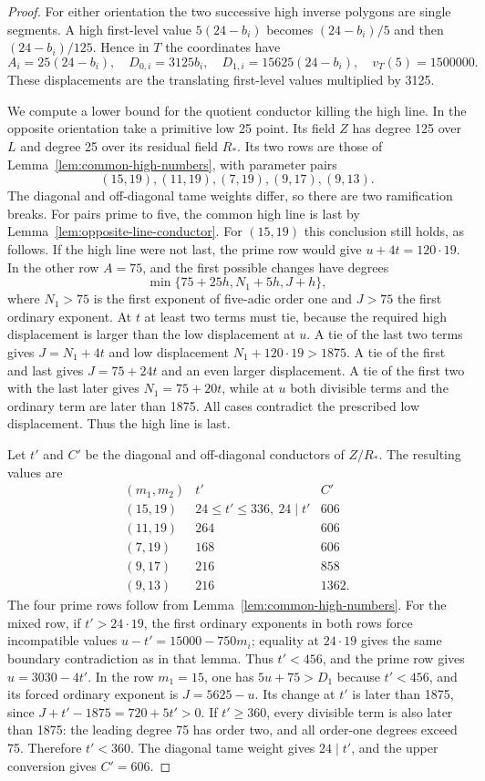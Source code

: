 \begin{proof}
For either orientation the two successive high inverse polygons are single segments. A high first-level value $5(24-b_i)$ becomes $(24-b_i)/5$ and then $(24-b_i)/125$. Hence in $T$ the coordinates have
\begin{equation}\label{eq:large-point-rows}
 A_i=25(24-b_i),\quad D_{0,i}=3125b_i,\quad
 D_{1,i}=15625(24-b_i),\quad v_T(5)=1500000.
\end{equation}
These displacements are the translating first-level values multiplied by 3125.

We compute a lower bound for the quotient conductor killing the high line. In the opposite orientation take a primitive low 25 point. Its field $Z$ has degree 125 over $L$ and degree 25 over its residual field $R_*$. Its two rows are those of Lemma~\ref{lem:common-high-numbers}, with parameter pairs
\[
                    (15,19),(11,19),(7,19),(9,17),(9,13).
\]
The diagonal and off-diagonal tame weights differ, so there are two ramification breaks. For pairs prime to five, the common high line is last by Lemma~\ref{lem:opposite-line-conductor}. For $(15,19)$ this conclusion still holds, as follows. If the high line were not last, the prime row would give $u+4t=120\cdot19$. In the other row $A=75$, and the first possible changes have degrees
\[
                \min\{75+25h,N_1+5h,J+h\},
\]
where $N_1>75$ is the first exponent of five-adic order one and $J>75$ the first ordinary exponent. At $t$ at least two terms must tie, because the required high displacement is larger than the low displacement at $u$. A tie of the last two terms gives $J=N_1+4t$ and low displacement $N_1+120\cdot19>1875$. A tie of the first and last gives $J=75+24t$ and an even larger displacement. A tie of the first two with the last later gives $N_1=75+20t$, while at $u$ both divisible terms and the ordinary term are later than 1875. All cases contradict the prescribed low displacement. Thus the high line is last.

Let $t'$ and $C'$ be the diagonal and off-diagonal conductors of $Z/R_*$. The resulting values are
\[
\begin{array}{c|c|r}
 (m_1,m_2)&t'&C'\\\hline
 (15,19)&24\le t'\le336,\ 24\mid t'&606\\
 (11,19)&264&606\\
 (7,19)&168&606\\
 (9,17)&216&858\\
 (9,13)&216&1362.
\end{array}
\]
The four prime rows follow from Lemma~\ref{lem:common-high-numbers}. For the mixed row, if $t'>24\cdot19$, the first ordinary exponents in both rows force incompatible values $u-t'=15000-750m_i$; equality at $24\cdot19$ gives the same boundary contradiction as in that lemma. Thus $t'<456$, and the prime row gives $u=3030-4t'$. In the row $m_1=15$, one has $5u+75>D_1$ because $t'<456$, and its forced ordinary exponent is $J=5625-u$. Its change at $t'$ is later than 1875, since $J+t'-1875=720+5t'>0$. If $t'\ge360$, every divisible term is also later than 1875: the leading degree 75 has order two, and all order-one degrees exceed 75. Therefore $t'<360$. The diagonal tame weight gives $24\mid t'$, and the upper conversion gives $C'=606$.


\end{proof}
